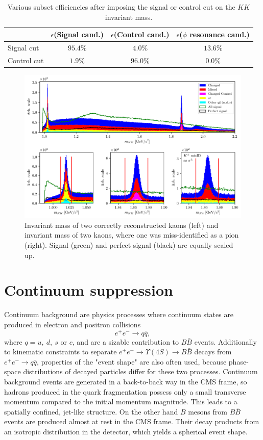 \begin{table}[H]
\centering
\begin{tabular}{|l|c|c|c|}
\hline
  & $\epsilon$(Signal cand.)& $\epsilon$(Control cand.) & $\epsilon$($\phi$ resonance cand.)\\
\hline
Signal cut & $95.4\%$ & $4.0\%$ & $13.6\%$ \\
\hline
Control cut & $1.9\%$ & $96.0\%$ & $0.0\%$ \\
\hline
\end{tabular}
\caption{Various subset efficiencies after imposing the signal or control cut on the $KK$ invariant mass.}
\label{tab:cut_eff}
\end{table}


\begin{figure}[H]
\centering
\captionsetup{width=0.8\linewidth}
\includegraphics[width=\linewidth]{fig/res_bkg}
\caption{Invariant mass of two correctly reconstructed kaons (left) and invariant mass of two kaons, where one was miss-identified as a pion (right). Signal (green) and perfect signal (black) are equally scaled up.}
\label{fig:res_bkg}
\end{figure}


\section{Continuum suppression}

Continuum background are physics processes where continuum states are produced in electron and positron collisions $$e^+ e^- \to q \bar q,$$ 
where $q = u,~d,~s$ or $c$, and are a sizable contribution to $B \bar B$ events. Additionally to kinematic constraints to separate $e^+ e^- \to \Upsilon(4S) \to B \bar B$ decays from $e^+ e^- \to q \bar q$, properties of the "event shape" are also often used, because phase-space distributions of decayed particles differ for these two processes. Continuum background events are generated in a back-to-back way in the CMS frame, so hadrons produced in the quark fragmentation possess only a small transverse momentum compared to the initial momentum magnitude. This leads to a spatially confined, jet-like structure. On the other hand $B$ mesons from $B \bar B$ events are produced almost at rest in the CMS frame. Their decay products from an isotropic distribution in the detector, which yields a spherical event shape.

